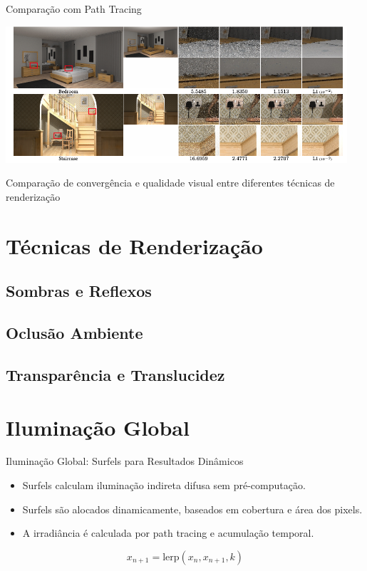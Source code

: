 \documentclass[aspectratio=169,xcolor=table]{beamer}
\begin{document}
\begin{frame}{Comparação com Path Tracing}
    \begin{center}
        \includegraphics[width=0.95\textwidth]{comparacao-path-tracing}
    \end{center}
    \begin{center}
        \small{Comparação de convergência e qualidade visual entre diferentes técnicas de renderização}
    \end{center}
\end{frame}

\section{Técnicas de Renderização}
\subsection{Sombras e Reflexos}
\subsection{Oclusão Ambiente}
\subsection{Transparência e Translucidez}

\section{Iluminação Global}
\begin{frame}{Iluminação Global: Surfels para Resultados Dinâmicos}
    \begin{itemize}
        \item Surfels calculam iluminação indireta difusa sem pré-computação.
        \item Surfels são alocados dinamicamente, baseados em cobertura e área dos pixels.
        \item A irradiância é calculada por path tracing e acumulação temporal.
    \end{itemize}
    \begin{equation*}
        x_{n+1} = \text{lerp}(x_n, x_{n+1}, k)
    \end{equation*}
\end{frame}
\end{document}
